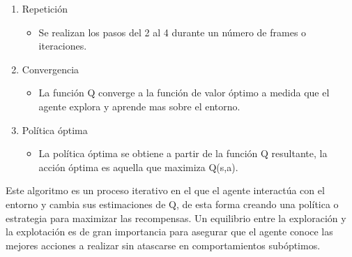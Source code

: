 \begin{enumerate}
	\item Repetición
		\begin{itemize}
			\item Se realizan los pasos del 2 al 4 durante un número de frames o iteraciones.
		\end{itemize}

	\item Convergencia
		\begin{itemize}
			\item La función Q converge a la función de valor óptimo a medida que el agente explora 	y aprende mas sobre el entorno.
		\end{itemize}

	\item Política óptima
		\begin{itemize}
			\item La política óptima se obtiene a partir de la función Q resultante, la acción 	óptima es aquella que maximiza Q(s,a).
		\end{itemize}
\end{enumerate}
Este algoritmo es un proceso iterativo en el que el agente interactúa con el entorno y cambia sus estimaciones de Q, de esta forma creando una política o estrategia para maximizar las recompensas. Un equilibrio entre la exploración y la explotación es de gran importancia para asegurar que el agente conoce las mejores acciones a realizar sin atascarse en comportamientos subóptimos.